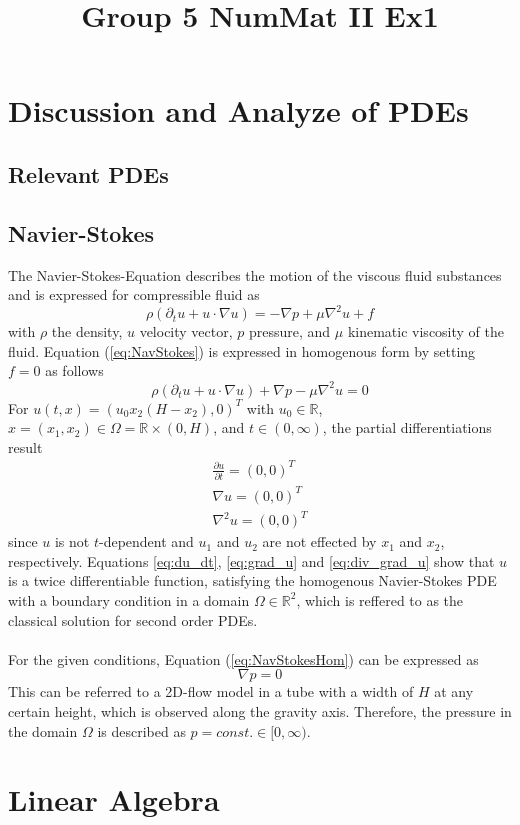 \documentclass[a4paper]{article}
\title{Group 5 NumMat II Ex1}
\newcommand{\R}{\mathbb{R}}
\newcommand*{\EQ}[1]{Equation (\ref{eq:#1})}
\begin{document}
	\begin{titlepage}
		\maketitle
		\thispagestyle{empty}
	\end{titlepage}
	\newpage


\section{Discussion and Analyze of PDEs}

\subsection{Relevant PDEs}

\subsection{Navier-Stokes}
The Navier-Stokes-Equation describes the motion of the viscous fluid substances and is expressed for compressible fluid as
\begin{equation}
	\rho(\partial_t u + u \cdot \nabla u) = - \nabla p + \mu \nabla ^2 u + f
	\label{eq:NavStokes}
\end{equation}
with $\rho$ the density, $u$ velocity vector, $p$ pressure, and $\mu$ kinematic viscosity of the fluid.
\EQ{NavStokes} is expressed in homogenous form by setting $f = 0$ as follows
\begin{equation}
	\rho(\partial_t u + u \cdot \nabla u) + \nabla p - \mu \nabla ^2 u = 0
	\label{eq:NavStokesHom}
\end{equation}
For $u (t,x) = (u_0 x_2 (H - x_2), 0)^T$ with $u_0 \in \R$, $x = (x_ 1, x_2) \in \Omega = \R \times (0, H)$, and $t \in (0, \infty)$, the partial differentiations result
\begin{align}
	\frac{\partial u}{\partial t} = (0,0)^T \label{eq:du_dt}   \\
	\nabla u = (0,0)^T  					\label{eq:grad_u} \\
	\nabla^2 u = (0,0)^T  					\label{eq:div_grad_u}
\end{align}
since $u$ is not $t$-dependent and $u_1$ and $u_2$ are not effected by $x_1$ and $x_2$, respectively.
Equations \ref{eq:du_dt}, \ref{eq:grad_u} and \ref{eq:div_grad_u} show that $u$ is a twice differentiable function, satisfying the homogenous Navier-Stokes PDE with a boundary condition in a domain $\Omega \in \R^2$, which is reffered to as the classical solution for second order PDEs.
\\ \\
For the given conditions, \EQ{NavStokesHom} can be expressed as
\begin{equation}
	\nabla p = 0
\end{equation}
This can be referred to a 2D-flow model in a tube with a width of $H$ at any certain height, which is observed along the gravity axis. Therefore, the pressure in the domain $\Omega$ is described as $p = const. \in [0, \infty)$. 
\section{Linear Algebra}
\end{document}
